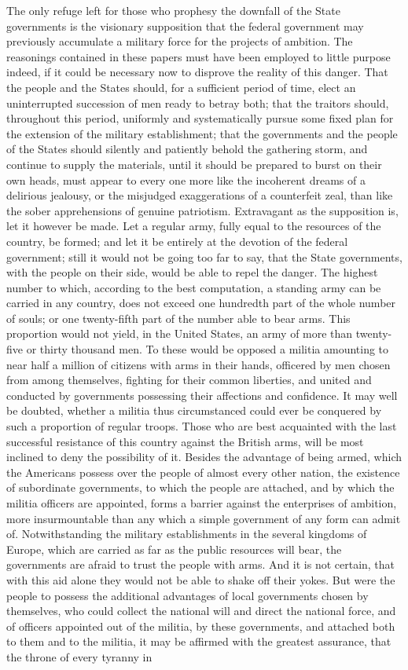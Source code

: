 The only refuge left for those who prophesy the downfall of the State governments is the visionary supposition that the federal government may previously accumulate a military force for the projects of ambition. The reasonings contained in these papers must have been employed to little purpose indeed, if it could be necessary now to disprove the reality of this danger. That the people and the States should, for a sufficient period of time, elect an uninterrupted succession of men ready to betray both; that the traitors should, throughout this period, uniformly and systematically pursue some fixed plan for the extension of the military establishment; that the governments and the people of the States should silently and patiently behold the gathering storm, and continue to supply the materials, until it should be prepared to burst on their own heads, must appear to every one more like the incoherent dreams of a delirious jealousy, or the misjudged exaggerations of a counterfeit zeal, than like the sober apprehensions of genuine patriotism. Extravagant as the supposition is, let it however be made. Let a regular army, fully equal to the resources of the country, be formed; and let it be entirely at the devotion of the federal government; still it would not be going too far to say, that the State governments, with the people on their side, would be able to repel the danger. The highest number to which, according to the best computation, a standing army can be carried in any country, does not exceed one hundredth part of the whole number of souls; or one twenty-fifth part of the number able to bear arms. This proportion would not yield, in the United States, an army of more than twenty-five or thirty thousand men. To these would be opposed a militia amounting to near half a million of citizens with arms in their hands, officered by men chosen from among themselves, fighting for their common liberties, and united and conducted by governments possessing their affections and confidence. It may well be doubted, whether a militia thus circumstanced could ever be conquered by such a proportion of regular troops. Those who are best acquainted with the last successful resistance of this country against the British arms, will be most inclined to deny the possibility of it. Besides the advantage of being armed, which the Americans possess over the people of almost every other nation, the existence of subordinate governments, to which the people are attached, and by which the militia officers are appointed, forms a barrier against the enterprises of ambition, more insurmountable than any which a simple government of any form can admit of. Notwithstanding the military establishments in the several kingdoms of Europe, which are carried as far as the public resources will bear, the governments are afraid to trust the people with arms. And it is not certain, that with this aid alone they would not be able to shake off their yokes. But were the people to possess the additional advantages of local governments chosen by themselves, who could collect the national will and direct the national force, and of officers appointed out of the militia, by these governments, and attached both to them and to the militia, it may be affirmed with the greatest assurance, that the throne of every tyranny in 